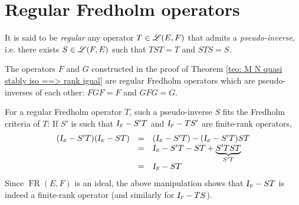 
\section{Regular Fredholm operators}
\label{sec: regular fredholm}

\begin{definicao}
It is said to be \textit{regular} any operator $T\in \mathscr L(E,F)$ that admits a \textit{pseudo-inverse}, i.e. there exists $S\in \mathscr L(F,E)$ such that $TST=T$ and $STS=S$. 
\end{definicao}

\begin{exemplo}
    The operators $F$ and $G$ constructed in the proof of Theorem \ref{teo: M N quasi stably iso ==> rank igual} are regular Fredholm operators which are pseudo-inverses of each other: $FGF=F$ and $GFG=G$.
\end{exemplo}

For a regular Fredholm operator $T$, such a pseudo-inverse $S$ fits the Fredholm criteria of $T$: If $S'$ is such that $\sub\Id E - S'T$ and $\sub\Id F - TS'$ are finite-rank operators,
\begin{equation*}
    \begin{array}{rcl}
        (\sub \Id E - S'T)(\sub \Id E - ST) &=&  (\sub\Id E - S'T) - (\sub \Id E - S'T)ST \\
        &=& \sub \Id E - S'T- ST + \underbrace{S'TST}_{S'T}  \\
        &=& \sub \Id E - ST
    \end{array}
\end{equation*}
Since $\operatorname{FR}(E,F)$ is an ideal, the above manipulation shows that $\sub\Id E - ST$ is indeed a finite-rank operator (and similarly for $\sub\Id F - TS$).

